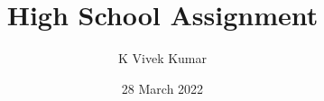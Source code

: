 \documentclass[journal,12pt,twocolumn]{IEEEtran}
\title{High School Assignment}
\author{K Vivek Kumar}
\DeclareMathOperator*{\Res}{Res}
\begin{document}
\date{28 March 2022}
\maketitle
%
\newtheorem{theorem}{Theorem}[section]
\newtheorem{problem}{Problem}
\newtheorem{proposition}{Proposition}[section]
\newtheorem{lemma}{Lemma}[section]
\newtheorem{corollary}[theorem]{Corollary}
\newtheorem{example}{Example}[section]
\newtheorem{definition}[problem]{Definition}
\newcommand{\BEQA}{\begin{eqnarray}}
\newcommand{\EEQA}{\end{eqnarray}}
\newcommand{\define}{\stackrel{\triangle}{=}}
\newcommand*\circled[1]{\tikz[baseline=(char.base)]{
    \node[shape=circle,draw,inner sep=2pt] (char) {#1};}}

%
\providecommand{\mbf}{\mathbf}
\providecommand{\pr}[1]{\ensuremath{\Pr\left(#1\right)}}
\providecommand{\qfunc}[1]{\ensuremath{Q\left(#1\right)}}
\providecommand{\sbrak}[1]{\ensuremath{{}\left[#1\right]}}
\providecommand{\lsbrak}[1]{\ensuremath{{}\left[#1\right.}}
\providecommand{\rsbrak}[1]{\ensuremath{{}\left.#1\right]}}
\providecommand{\brak}[1]{\ensuremath{\left(#1\right)}}
\providecommand{\lbrak}[1]{\ensuremath{\left(#1\right.}}
\providecommand{\rbrak}[1]{\ensuremath{\left.#1\right)}}
\providecommand{\cbrak}[1]{\ensuremath{\left\{#1\right\}}}
\providecommand{\lcbrak}[1]{\ensuremath{\left\{#1\right.}}
\providecommand{\rcbrak}[1]{\ensuremath{\left.#1\right\}}}
\theoremstyle{remark}
\newtheorem{rem}{Remark}
\newcommand{\sgn}{\mathop{\mathrm{sgn}}}
\providecommand{\abs}[1]{\left\vert#1\right\vert}
\providecommand{\res}[1]{\Res\displaylimits_{#1}} 
\providecommand{\norm}[1]{\left\lVert#1\right\rVert}
\providecommand{\mtx}[1]{\mathbf{#1}}
\providecommand{\mean}[1]{E\left[ #1 \right]}
\providecommand{\fourier}{\overset{\mathcal{F}}{ \rightleftharpoons}}
\providecommand{\system}{\overset{\mathcal{H}}{ \longleftrightarrow}}
\newcommand{\solution}{\noindent \textbf{Solution: }}
\newcommand{\cosec}{\,\text{cosec}\,}
\providecommand{\dec}[2]{\ensuremath{\overset{#1}{\underset{#2}{\gtrless}}}}
\newcommand{\myvec}[1]{\ensuremath{\begin{pmatrix}#1\end{pmatrix}}}
\end{document}
